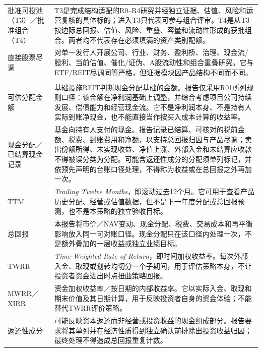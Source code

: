 \begin{longtable}{p{2.9cm}p{7.2cm}}
批准可投池（T3）／批准组合（T4） & T3是完成结构适配的R0--R4研究并经独立证据、估值、风险和运营复核的具体标的；进入T3只代表可参与组合评审。T4是从T3按边际总回报、估值、风险、重叠、容量和流动性形成的获批组合。两者均不代表存在必须填满的资产类别配额。 \\

直接股票尽调 & 对单一发行人开展公司、行业、财务、盈利桥、治理、现金流/股利、当前估值、催化/证伪、A股流动性和组合重叠研究。它与ETF/REIT尽调同等严格，但证据模块因产品结构不同而不同。 \\

\addlinespace[0.25em]
\multicolumn{2}{l}{\textbf{现金与业绩计量}} \\
\addlinespace[0.25em]
可供分配金额 & 基础设施REIT判断现金分配基础的金额。报告仅采用R01所列规则口径：该金额在净利润基础上调整，并综合考虑项目公司持续发展、偿债能力和经营现金流。它不是净利润本身、不是持有人实际到账净现金，也不能直接当作按买入成本计算的收益率。 \\

现金分配／已结算现金记录 & 基金向持有人支付的现金。报告记录已结算、可核对的税前金额、税费、到账费用和净额，以支持总回报归因与产品尽调；卖出份额所得、未实现收益、净值上涨、外部入金和未结算应收款不得被误分类为分配。可能含返还性成分的分配须单列标记，并依预先声明的台账口径处理，不得称为收益或在总回报之外再加一次。 \\

TTM & \textit{Trailing Twelve Months}，即滚动过去12个月。它可用于查看产品历史分配、经营或估值数据，但不是下一年度分配或总回报预测，也不是本策略的独立验收目标。 \\

总回报 & 本报告将市价／NAV变动、现金分配、税费、交易成本和再平衡影响放入同一可对账口径。现金分配只在该口径内处理一次，不是额外叠加的一层收益或独立业绩目标。 \\

TWRR & \textit{Time-Weighted Rate of Return}，即时间加权收益率。每次外部入金、取现或划转均切分一个子期间，用于评估策略本身，不让投资者资金进出时点扭曲策略回报。 \\

MWRR／XIRR & 资金加权收益率／按日期的内部收益率。它以实际入金、取现和期末价值及其日期计算，用于反映投资者自身的资金体验；不能替代TWRR评价策略。 \\

返还性成分 & 可能反映资本返还而非经营或投资收益的现金组成部分。报告要求将其单列并在经济性质得到独立确认前排除出投资收益归因；最终处理不得造成总回报重复计数。 \\


\end{longtable}
